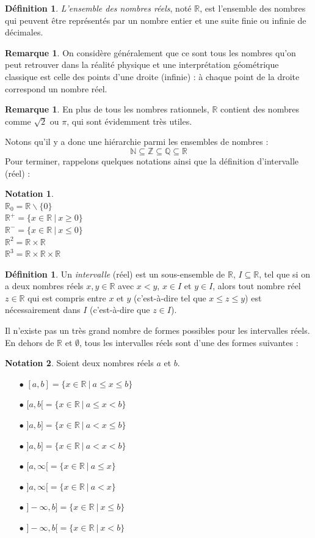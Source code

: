 \documentclass[a4paper,13pt]{scrreprt}
\theoremstyle{plain}
\theoremstyle{definition}
\newtheorem{déf}[subsection]{Définition}
\newtheorem{rema}[subsection]{Remarque}
\newtheorem*{nota}{Notation}
\newcommand{\nn}{\mathbb{N}}
\newcommand{\zz}{\mathbb{Z}}
\newcommand{\qu}{\mathbb{Q}}
\newcommand{\rr}{\mathbb{R}}
\begin{document}
\begin{déf}
	\emph{L'ensemble des nombres réels}, noté $\rr$, est l'ensemble des nombres qui peuvent être représentés par un nombre entier et une suite finie ou infinie de décimales.
\end{déf}
\begin{rema}
	On considère généralement que ce sont tous les nombres qu'on peut retrouver dans la réalité physique et une interprétation géométrique classique est celle des points d'une droite (infinie) : à chaque point de la droite correspond un nombre réel.
\end{rema}
\begin{rema}
	En plus de tous les nombres rationnels, $\rr$ contient des nombres comme $\sqrt{2}$ ou $\pi$, qui sont évidemment très utiles.
\end{rema}
Notons qu'il y a donc une hiérarchie parmi les ensembles de nombres :
$$\nn \subseteq \zz \subseteq \qu \subseteq \rr$$
Pour terminer, rappelons quelques notations ainsi que la définition d'intervalle (réel) :
\begin{nota}
	~~\\
	${\rr}_{0} = \rr \backslash \{0\}$ \\
	${\rr}^{+} = \{x \in \rr~|~x \ge 0\}$ \\
	${\rr}^{-} = \{x \in \rr~|~x \le 0\}$ \\
	${\rr}^{2} = \rr \times \rr$ \\
	${\rr}^{3} = \rr \times \rr \times \rr$
\end{nota}
\begin{déf}
	Un \emph{intervalle} (réel) est un sous-ensemble de $\rr$, $I \subseteq \rr$, tel que si on a deux nombres réels $x,y \in \rr$ avec $x < y$, $x \in I$ et $y \in I$, alors tout nombre réel $z \in \rr$ qui est compris entre $x$ et $y$ (c'est-à-dire tel que $x\le z \le y$) est nécessairement dans $I$ (c'est-à-dire que $z \in I$).
\end{déf}
Il n'existe pas un très grand nombre de formes possibles pour les intervalles réels. En dehors de $\rr$ et $\emptyset$, tous les intervalles réels sont d'une des formes suivantes :
\begin{nota}
	Soient deux nombres réels $a$ et $b$. \\
	\begin{itemize}
		\item [$\bullet$] $[a,b] = \{x \in \rr~|~a \le x \le b\}$
		\item [$\bullet$] $[a,b[ = \{x \in \rr~|~a \le x < b\}$
		\item [$\bullet$] $]a,b] = \{x \in \rr~|~a < x \le b\}$
		\item [$\bullet$] $]a,b] = \{x \in \rr~|~a < x < b\}$
		\item [$\bullet$] $[a,\infty[ = \{x \in \rr~|~a \le x\}$
		\item [$\bullet$] $]a,\infty[ = \{x \in \rr~|~a < x\}$
		\item [$\bullet$] $]-\infty,b] = \{x \in \rr~|~x \le b\}$
		\item [$\bullet$] $]-\infty,b[ = \{x \in \rr~|~x < b\}$
	\end{itemize}
\end{nota}
\end{document}
